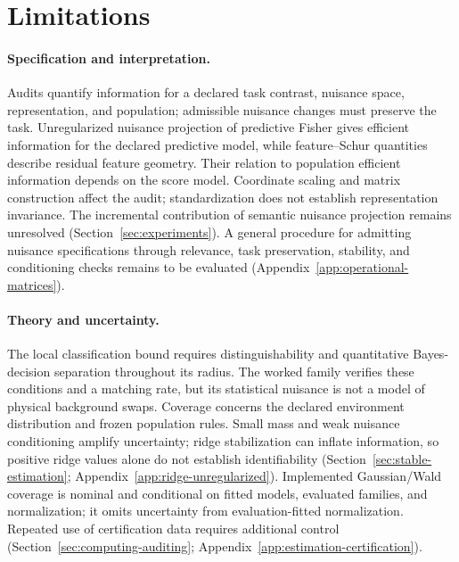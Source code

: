 \section{Limitations}
\label{sec:limitations}

\paragraph{Specification and interpretation.}
Audits quantify information for a declared task contrast, nuisance space, representation, and population; admissible nuisance changes must preserve the task. Unregularized nuisance projection of predictive Fisher gives efficient information for the declared predictive model, while feature--Schur quantities describe residual feature geometry. Their relation to population efficient information depends on the score model. Coordinate scaling and matrix construction affect the audit; standardization does not establish representation invariance. The incremental contribution of semantic nuisance projection remains unresolved (Section~\ref{sec:experiments}). A general procedure for admitting nuisance specifications through relevance, task preservation, stability, and conditioning checks remains to be evaluated (Appendix~\ref{app:operational-matrices}).

\paragraph{Theory and uncertainty.}
The local classification bound requires distinguishability and quantitative Bayes-decision separation throughout its radius. The worked family verifies these conditions and a matching rate, but its statistical nuisance is not a model of physical background swaps. Coverage concerns the declared environment distribution and frozen population rules. Small mass and weak nuisance conditioning amplify uncertainty; ridge stabilization can inflate information, so positive ridge values alone do not establish identifiability (Section~\ref{sec:stable-estimation}; Appendix~\ref{app:ridge-unregularized}). Implemented Gaussian/Wald coverage is nominal and conditional on fitted models, evaluated families, and normalization; it omits uncertainty from evaluation-fitted normalization. Repeated use of certification data requires additional control (Section~\ref{sec:computing-auditing}; Appendix~\ref{app:estimation-certification}).

